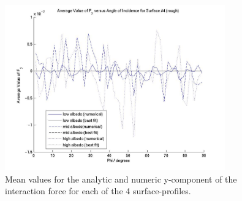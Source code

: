 \begin{description}
\begin{figure}[!ht]
        \includegraphics[width=95mm]{figs/sda/F__y_diff__rough.jpg}
        \caption{Mean values for the analytic and numeric y-component of
                the interaction force for each of the 4
                surface-profiles.}
        \label{fig:ivv_sda_f_vector_diffs_y}
      \end{figure}


\end{description}
